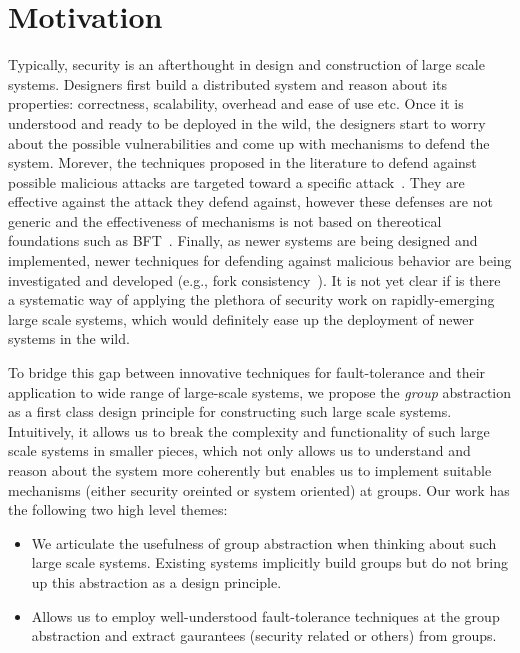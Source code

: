 
\section{Motivation}
Typically, security is an afterthought in design and construction of large scale systems. Designers first build a distributed system and reason about its properties: correctness, scalability, overhead and ease of use etc. Once it is understood and ready to be deployed in the wild, the designers start to worry about the possible vulnerabilities and come up with mechanisms to defend the system. Morever, the techniques proposed in the literature to defend against possible malicious attacks are targeted toward a specific attack~\cite{}. They are effective against the attack they defend against, however these defenses are not generic and the effectiveness of mechanisms is not based on thereotical foundations such as BFT~\cite{}. Finally, as newer systems are being designed and implemented, newer techniques for defending against malicious behavior are being investigated and developed (e.g., fork consistency~\cite{}). It is not yet clear if is there a systematic way of applying the plethora of security work on rapidly-emerging large scale systems, which would definitely ease up the deployment of newer systems in the wild.


To bridge this gap between innovative techniques for fault-tolerance and their application to wide range of large-scale systems, we propose the \textit{group} abstraction as a first class design principle for constructing such large scale systems. Intuitively, it allows us to break the complexity and functionality of such large scale systems in smaller pieces, which not only allows us to understand and reason about the system more coherently but enables us to implement suitable mechanisms (either security oreinted or system oriented) at groups. Our work has the following two high level themes:
\begin{itemize}
\item{} We articulate the usefulness of group abstraction when thinking about such large scale systems. Existing systems implicitly build groups but do not bring up this abstraction as a design principle.
\item{} Allows us to employ well-understood fault-tolerance techniques at the group abstraction and extract gaurantees (security related or others) from groups.
\end{itemize}

